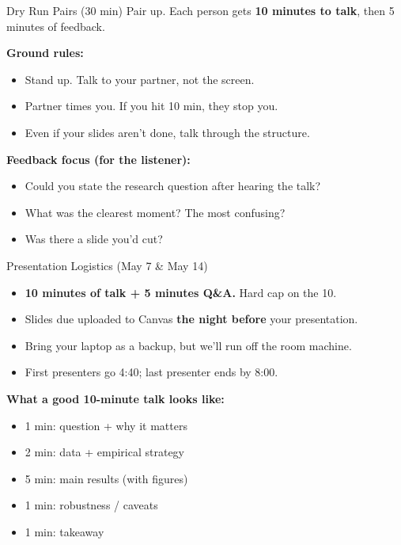 \begin{frame}{Dry Run Pairs (30 min)}
  Pair up. Each person gets \textbf{10 minutes to talk}, then 5 minutes of feedback.

  \vspace{8pt}

  \textbf{Ground rules:}
  \begin{itemize}\setlength\itemsep{1pt}
    \item Stand up. Talk to your partner, not the screen.
    \item Partner times you. If you hit 10 min, they stop you.
    \item Even if your slides aren't done, talk through the structure.
  \end{itemize}

  \vspace{8pt}

  \textbf{Feedback focus (for the listener):}
  \begin{itemize}\setlength\itemsep{1pt}
    \item Could you state the research question after hearing the talk?
    \item What was the clearest moment? The most confusing?
    \item Was there a slide you'd cut?
  \end{itemize}
\end{frame}

\begin{frame}{Presentation Logistics (May 7 \& May 14)}
  \small
  \begin{itemize}\setlength\itemsep{2pt}
    \item \textbf{10 minutes of talk + 5 minutes Q\&A.} Hard cap on the 10.
    \item Slides due uploaded to Canvas \textbf{the night before} your presentation.
    \item Bring your laptop as a backup, but we'll run off the room machine.
    \item First presenters go 4:40; last presenter ends by 8:00.
  \end{itemize}

  \vspace{8pt}

  \textbf{What a good 10-minute talk looks like:}
  \begin{itemize}\setlength\itemsep{1pt}
    \item 1 min: question + why it matters
    \item 2 min: data + empirical strategy
    \item 5 min: main results (with figures)
    \item 1 min: robustness / caveats
    \item 1 min: takeaway
  \end{itemize}
\end{frame}


